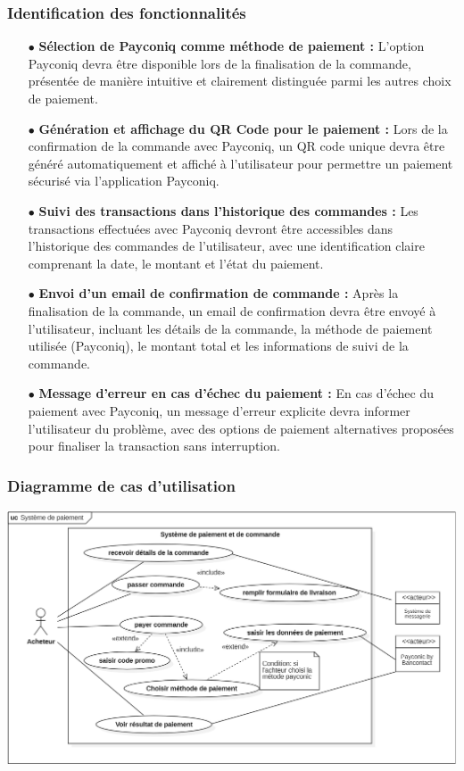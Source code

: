 \subsubsection{Identification des fonctionnalités}
\begin{itemize}
    \item [$\bullet$]\textbf{Sélection de Payconiq comme méthode de paiement :} L’option Payconiq devra être disponible lors de la finalisation de la commande, présentée de manière intuitive et clairement distinguée parmi les autres choix de paiement.
    \item [$\bullet$]\textbf{Génération et affichage du QR Code pour le paiement :} Lors de la confirmation de la commande avec Payconiq, un QR code unique devra être généré automatiquement et affiché à l’utilisateur pour permettre un paiement sécurisé via l’application Payconiq.
    \item [$\bullet$]\textbf{Suivi des transactions dans l'historique des commandes :} Les transactions effectuées avec Payconiq devront être accessibles dans l’historique des commandes de l’utilisateur, avec une identification claire comprenant la date, le montant et l’état du paiement.
    \item [$\bullet$]\textbf{Envoi d'un email de confirmation de commande :} Après la finalisation de la commande, un email de confirmation devra être envoyé à l’utilisateur, incluant les détails de la commande, la méthode de paiement utilisée (Payconiq), le montant total et les informations de suivi de la commande.
    \item [$\bullet$]\textbf{Message d'erreur en cas d'échec du paiement :} En cas d’échec du paiement avec Payconiq, un message d’erreur explicite devra informer l’utilisateur du problème, avec des options de paiement alternatives proposées pour finaliser la transaction sans interruption.
\end{itemize}

\subsubsection{Diagramme de cas d’utilisation}
\begin{center}
    \centering
    \includegraphics[width=19cm]{Figures/usecase.png}
    \label{fig:usecase}
\end{center}

